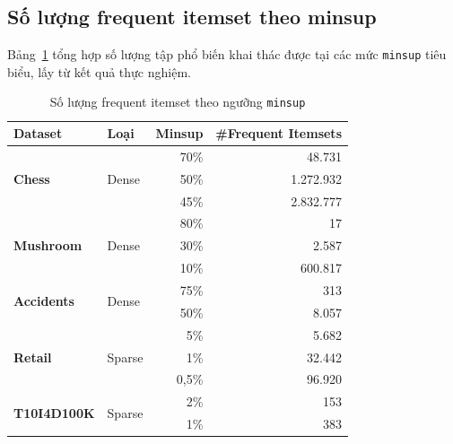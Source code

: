 \documentclass[12pt,a4paper]{report}
\begin{document}
\subsection{Số lượng frequent itemset theo minsup}

Bảng~\ref{tab:itemset-count} tổng hợp số lượng tập phổ biến khai thác được tại
các mức \texttt{minsup} tiêu biểu, lấy từ kết quả thực nghiệm.

\begin{table}[H]
    \centering
    \caption{Số lượng frequent itemset theo ngưỡng \texttt{minsup}}
    \label{tab:itemset-count}
    \begin{tabular}{|l|l|r|r|}
    \hline
    \textbf{Dataset} & \textbf{Loại} & \textbf{Minsup} & \textbf{\#Frequent Itemsets} \\
    \hline
    \multirow{3}{*}{\textbf{Chess}}
        & \multirow{3}{*}{Dense}
        & 70\% & 48.731 \\
        \cline{3-4}
        & & 50\% & 1.272.932 \\
        \cline{3-4}
        & & 45\% & 2.832.777 \\
    \hline
    \multirow{3}{*}{\textbf{Mushroom}}
        & \multirow{3}{*}{Dense}
        & 80\% & 17 \\
        \cline{3-4}
        & & 30\% & 2.587 \\
        \cline{3-4}
        & & 10\% & 600.817 \\
    \hline
    \multirow{2}{*}{\textbf{Accidents}}
        & \multirow{2}{*}{Dense}
        & 75\% & 313 \\
        \cline{3-4}
        & & 50\% & 8.057 \\
    \hline
    \multirow{3}{*}{\textbf{Retail}}
        & \multirow{3}{*}{Sparse}
        & 5\%    & 5.682 \\
        \cline{3-4}
        & & 1\%    & 32.442 \\
        \cline{3-4}
        & & 0{,}5\% & 96.920 \\
    \hline
    \multirow{2}{*}{\textbf{T10I4D100K}}
        & \multirow{2}{*}{Sparse}
        & 2\% & 153 \\
        \cline{3-4}
        & & 1\% & 383 \\
    \hline
    \end{tabular}
\end{table}
\end{document}
